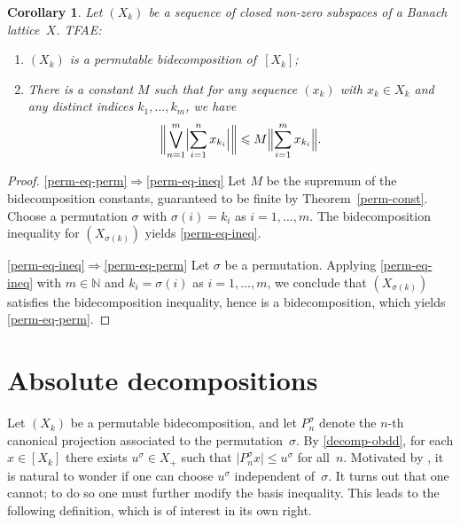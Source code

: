\documentclass[12pt]{amsart}
\theoremstyle{plain}
\newtheorem{corollary}[theorem]{Corollary}
\theoremstyle{definition}
\newcommand{\abs}[1]{\lvert#1\rvert}
\newcommand{\Bigabs}[1]{\Bigl\lvert#1\Bigr\rvert}
\newcommand{\Bignorm}[1]{\Bigl\lVert#1\Bigr\rVert}
\newcommand{\biggnorm}[1]{\biggl\lVert#1\biggr\rVert}
\renewcommand{\le}{\leqslant}
\begin{document}
\begin{corollary}\label{perm-eq}
  Let $(X_k)$ be a sequence of closed non-zero subspaces of a Banach
  lattice~$X$. TFAE:
  \begin{enumerate}
  \item\label{perm-eq-perm} $(X_k)$ is a permutable bidecomposition of~$[X_k]$;
  \item\label{perm-eq-ineq} There is a constant $M$ such that for
    any sequence $(x_k)$ with $x_k\in X_k$ and any distinct indices
    $k_1,\dots,k_m$, we have
  \begin{displaymath}
    \biggnorm{\bigvee_{n=1}^m\Bigabs{\sum_{i=1}^n x_{k_i}}}
    \le M\Bignorm{\sum_{i=1}^mx_{k_i}}.
  \end{displaymath}
  \end{enumerate}
\end{corollary}

\begin{proof}
  \eqref{perm-eq-perm}$\Rightarrow$\eqref{perm-eq-ineq} Let $M$ be the supremum of the bidecomposition constants, guaranteed to be finite by Theorem~\ref{perm-const}. Choose a permutation $\sigma$ with
  $\sigma(i)=k_i$ as $i=1,\dots,m$. The bidecomposition inequality
  for $(X_{\sigma(k)})$ yields \eqref{perm-eq-ineq}.
  
  \eqref{perm-eq-ineq}$\Rightarrow$\eqref{perm-eq-perm} 
  Let $\sigma$ be a permutation. Applying \eqref{perm-eq-ineq} with
  $m\in\mathbb N$ and $k_i=\sigma(i)$ as $i=1,\dots,m$, we conclude
  that  $(X_{\sigma(k)})$ satisfies the bidecomposition inequality, hence is a
  bidecomposition, which yields \eqref{perm-eq-perm}.
\end{proof}


\section{Absolute decompositions}

Let $(X_k)$ be a permutable bidecomposition, and let $P_n^\sigma$
denote the $n$-th canonical projection associated to the
permutation~$\sigma$. By \eqref{decomp-obdd}, for each
$x\in [X_k]$ there exists $u^\sigma\in X_+$ such that
$\abs{P_n^\sigma x}\le u^\sigma$ for all~$n$. Motivated by
, it is natural to wonder if one can choose
$u^\sigma$ independent of~$\sigma$. It turns out that one cannot; to
do so one must further modify the basis inequality. This leads to the
following definition, which is of interest in its own right.
\end{document}
